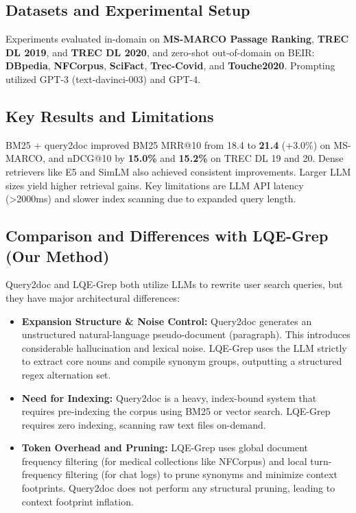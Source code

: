 \documentclass[11pt,a4paper]{article}
\begin{document}
\subsection{Datasets and Experimental Setup}
Experiments evaluated in-domain on \textbf{MS-MARCO Passage Ranking}, \textbf{TREC DL 2019}, and \textbf{TREC DL 2020}, and zero-shot out-of-domain on BEIR: \textbf{DBpedia}, \textbf{NFCorpus}, \textbf{SciFact}, \textbf{Trec-Covid}, and \textbf{Touche2020}. Prompting utilized GPT-3 (text-davinci-003) and GPT-4.

\subsection{Key Results and Limitations}
BM25 + query2doc improved BM25 MRR@10 from 18.4 to \textbf{21.4} (+3.0\%) on MS-MARCO, and nDCG@10 by \textbf{15.0\%} and \textbf{15.2\%} on TREC DL 19 and 20. Dense retrievers like E5 and SimLM also achieved consistent improvements. Larger LLM sizes yield higher retrieval gains. Key limitations are LLM API latency (>2000ms) and slower index scanning due to expanded query length.

\subsection{Comparison and Differences with LQE-Grep (Our Method)}
Query2doc and LQE-Grep both utilize LLMs to rewrite user search queries, but they have major architectural differences:
\begin{itemize}
    \item \textbf{Expansion Structure & Noise Control:} Query2doc generates an unstructured natural-language pseudo-document (paragraph). This introduces considerable hallucination and lexical noise. LQE-Grep uses the LLM strictly to extract core nouns and compile synonym groups, outputting a structured regex alternation set.
    \item \textbf{Need for Indexing:} Query2doc is a heavy, index-bound system that requires pre-indexing the corpus using BM25 or vector search. LQE-Grep requires zero indexing, scanning raw text files on-demand.
    \item \textbf{Token Overhead and Pruning:} LQE-Grep uses global document frequency filtering (for medical collections like NFCorpus) and local turn-frequency filtering (for chat logs) to prune synonyms and minimize context footprints. Query2doc does not perform any structural pruning, leading to context footprint inflation.
\end{itemize}
\end{document}
